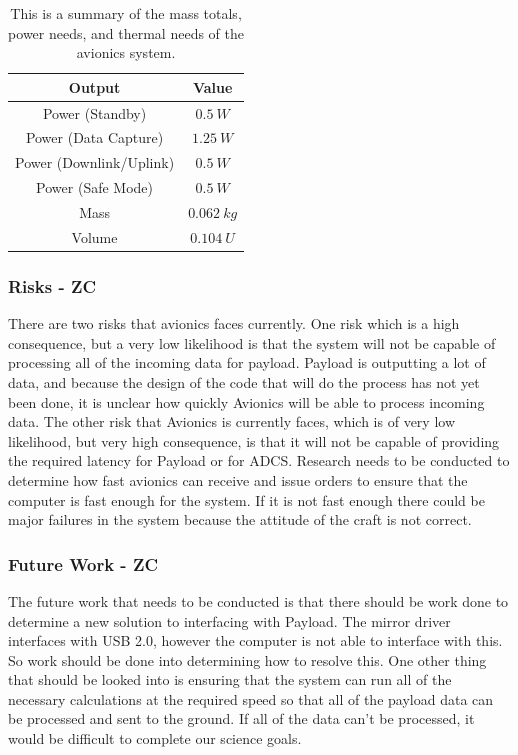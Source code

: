 \documentclass[12pt]{article}
\begin{document}
\begin{table}[ht]
\caption{This is a summary of the mass totals, power needs, and thermal needs of the avionics system.}
\label{table:avionics_summary_outputs}
\begin{center}
    \begin{tabular}{|c||c|} \hline
    	Output & Value \\ \hline \hline
    Power (Standby) & $0.5\ W$  \\
    Power (Data Capture) & $1.25\ W$ \\
    Power (Downlink/Uplink) & $0.5\ W$ \\
    Power (Safe Mode) & $0.5\ W$ \\
    Mass & $0.062\ kg$  \\
    Volume & $0.104\ U$ \\ \hline 
    \end{tabular}
\end{center}
\end{table}

			\subsubsection{Risks - ZC}
There are two risks that avionics faces currently. One risk which is a high consequence, but a very low likelihood is that the system will not be capable of processing all of the incoming data for payload. Payload is outputting a lot of data, and because the design of the code that will do the process has not yet been done, it is unclear how quickly Avionics will be able to process incoming data. The other risk that Avionics is currently faces, which is of very low likelihood, but very high consequence, is that it will not be capable of providing the required latency for Payload or for ADCS. Research needs to be conducted to determine how fast avionics can receive and issue orders to ensure that the computer is fast enough for the system. If it is not fast enough there could be major failures in the system because the attitude of the craft is not correct.

			\subsubsection{Future Work - ZC}
The future work that needs to be conducted is that there should be work done to determine a new solution to interfacing with Payload. The mirror driver interfaces with USB 2.0, however the computer is not able to interface with this. So work should be done into determining how to resolve this. One other thing that should be looked into is ensuring that the system can run all of the necessary calculations at the required speed so that all of the payload data can be processed and sent to the ground. If all of the data can’t be processed, it would be difficult to complete our science goals.
\end{document}
